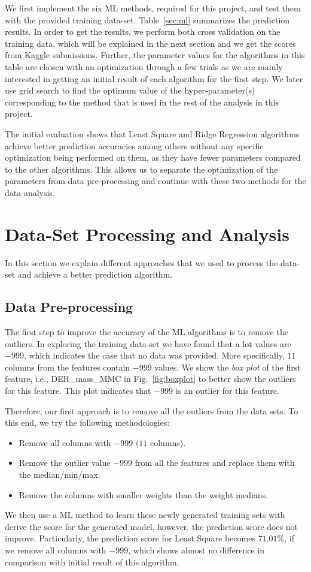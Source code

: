 \documentclass[10pt,conference,compsocconf]{IEEEtran}
\begin{document}
We first implement the six \gls{ML} methods, required for this project, and test them with the provided training data-set. Table~\ref{sec:ml} summarizes the prediction results. In order to get the results, we perform both cross validation on the training data, which will be explained in the next section and we get the scores from Kaggle submissions. Further, the parameter values for the algorithms in this table are chosen with an optimization through a few trials as we are mainly interested in getting an initial result of each algorithm for the first step.
We later use grid search to find the optimum value of the hyper-parameter(s) corresponding to the method that is used in the rest of the analysis in this project.

The initial evaluation shows that Least Square and Ridge Regression algorithms achieve better prediction accuracies among others without any specific optimization being performed on them, as they have fewer parameters compared to the other algorithms. This allows us to separate the optimization of the parameters from data pre-processing and continue with these two methods for the data analysis.


\section{Data-Set Processing and Analysis}\label{sec:data}

In this section we explain different approaches that we used to process the data-set and achieve a better prediction algorithm.

\subsection{Data Pre-processing}
The first step to improve the accuracy of the \gls{ML} algorithms is to remove the outliers.
In exploring the training data-set we have found that a lot values are $-999$, which indicates the case that no data was provided. More specifically, $11$ columns from the features contain $-999$ values.
We show the \emph{box plot} of the first feature, i.e., DER\_mass\_MMC in Fig.~\ref{fig:boxplot} to better show the outliers for this feature.
This plot indicates that $-999$ is an outlier for this feature.

Therefore, our first approach is to remove all the outliers from the data sets. To this end, we try the following methodologies:
\begin{itemize}
\item Remove all columns with $-999$ ($11$ columns).
\item Remove the outlier value $-999$ from all the features and replace them with the median/min/max.
\item Remove the columns with smaller weights than the weight medians.
\end{itemize}
We then use a \gls{ML} method to learn these newly generated training sets with derive the score for the generated model, however, the prediction score does not improve. Particularly, the prediction score for Least Square becomes $71.01\%$, if we remove all columns with $-999$, which shows almost no difference in comparison with initial result of this algorithm.
\end{document}
